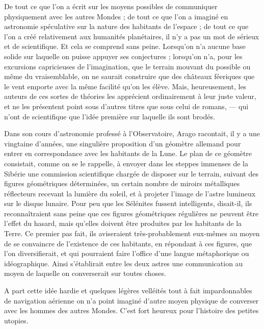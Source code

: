 \documentclass[a4paper, 11pt, oneside, landscape]{article}
\begin{document}
De tout ce que l'on a écrit sur les moyens possibles de communiquer physiquement avec les autres Mondes ; de tout ce que l'on a imaginé en astronomie spéculative sur la nature des habitants de l'espace ; de tout ce que l'on a créé relativement aux humanités planétaires, il n'y a pas un mot de sérieux et de scientifique. Et cela se comprend sans peine. Lorsqu'on n'a aucune base solide sur laquelle on puisse appuyer ses conjectures ; lorsqu'on n'a, pour les excursions capricieuses de l'imagination, que le terrain mouvant du possible ou même du vraisemblable, on ne saurait construire que des châteaux féeriques que le vent emporte avec la même facilité qu'on les élève. Mais, heureusement, les auteurs de ces sortes de théories les apprécient ordinairement à leur juste valeur, et ne les présentent point sous d'autres titres que sous celui de romans, --- qui n'ont de scientifique que l'idée première sur laquelle ils sont brodés.

Dans son cours d'astronomie professé à l'Observatoire, Arago racontait, il y a une vingtaine d'années, une singulière proposition d'un géomètre allemand pour entrer en correspondance avec les habitants de la Lune. Le plan de ce géomètre consistait, comme on se le rappelle, à envoyer dans les steppes immenses de la Sibérie une commission scientifique chargée de disposer sur le terrain, suivant des figures géométriques déterminées, un certain nombre de miroirs métalliques réflecteurs recevant la lumière du soleil, et à projeter l'image de l'astre lumineux sur le disque lunaire. Pour peu que les Sélénites fussent intelligents, disait-il, ils reconnaîtraient sans peine que ces figures géométriques régulières ne peuvent être l'effet du hasard, mais qu'elles doivent être produites par les habitants de la Terre. Ce premier pas fait, ils aviseraient très-probablement eux-mêmes au moyen de se convaincre de l'existence de ces habitants, en répondant à ces figures, que l'on diversifierait, et qui pourraient faire l'office d'une langue métaphorique ou idéographique. Ainsi s'établirait entre les deux astres une communication au moyen de laquelle on converserait sur toutes choses.

A part cette idée hardie et quelques légères velléités tout à fait impardonnables de navigation aérienne on n'a point imaginé d'autre moyen physique de converser avec les hommes des autres Mondes. C'est fort heureux pour l'histoire des petites utopies.
\end{document}
